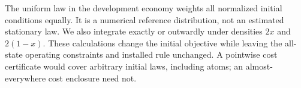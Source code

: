 The uniform law in the development economy weights all normalized initial conditions equally. It is a numerical reference distribution, not an estimated stationary law. We also integrate exactly or outwardly under densities $2x$ and $2(1-x)$. These calculations change the initial objective while leaving the all-state operating constraints and installed rule unchanged. A pointwise cost certificate would cover arbitrary initial laws, including atoms; an almost-everywhere cost enclosure need not.


